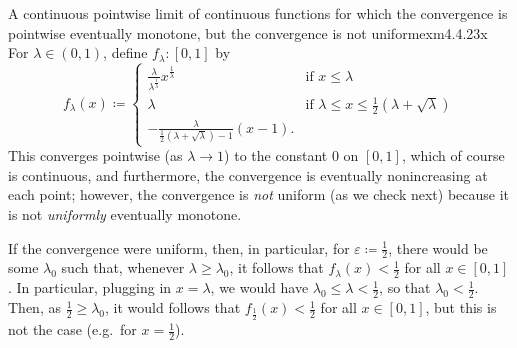 \begin{exm}{A continuous pointwise limit of continuous functions for which the convergence is pointwise eventually monotone, but the convergence is not uniform}{exm4.4.23x}
For $\lambda \in (0,1)$, define $f_{\lambda}\colon [0,1]$ by
\begin{equation*}
f_{\lambda}(x)\coloneqq \begin{cases}\frac{\lambda}{\lambda ^{\tfrac{1}{\lambda}}}x^{\tfrac{1}{\lambda}} & \text{if }x\leq \lambda  \\ \lambda & \text{if }\lambda \leq x\leq \tfrac{1}{2}(\lambda +\sqrt{\lambda}) \\ -\frac{\lambda}{\tfrac{1}{2}(\lambda +\sqrt{\lambda})-1}(x-1).\end{cases}
\end{equation*}
This converges pointwise (as $\lambda \to 1$) to the constant $0$ on $[0,1]$, which of course is continuous, and furthermore, the convergence is eventually nonincreasing at each point; however, the convergence is \emph{not} uniform (as we check next) because it is not \emph{uniformly} eventually monotone.

If the convergence were uniform, then, in particular, for $\varepsilon \coloneqq \frac{1}{2}$, there would be some $\lambda _0$ such that, whenever $\lambda \geq \lambda _0$, it follows that $f_{\lambda}(x)<\frac{1}{2}$ for all $x\in [0,1]$.  In particular, plugging in $x=\lambda$, we would have $\lambda _0\leq \lambda <\frac{1}{2}$, so that $\lambda _0<\frac{1}{2}$.  Then, as $\frac{1}{2}\geq \lambda _0$, it would follows that $f_{\frac{1}{2}}(x)<\frac{1}{2}$ for all $x\in [0,1]$, but this is not the case (e.g.~for $x=\frac{1}{2}$).
\end{exm}
